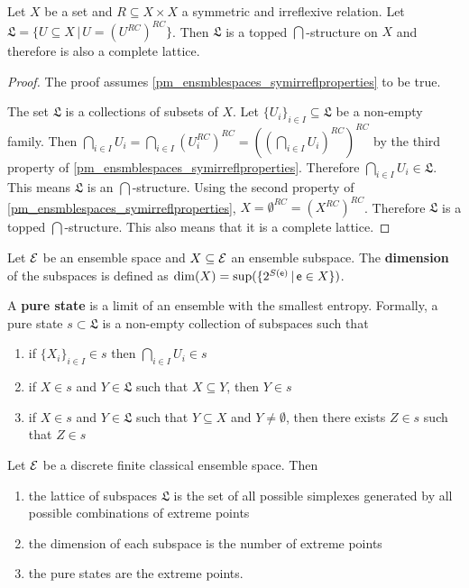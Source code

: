 \begin{conj}
	Let $X$ be a set and $R \subseteq X \times X$ a symmetric and irreflexive relation. Let $\mathfrak{L} = \{ U \subseteq X \, | \, U = (U^{RC})^{RC} \}$. Then $\mathfrak{L}$ is a topped $\bigcap$-structure on $X$ and therefore is also a complete lattice.
\end{conj}
\begin{proof}
	The proof assumes \ref{pm_ensmblespaces_symirreflproperties} to be true.
	
	The set $\mathfrak{L}$ is a collections of subsets of $X$. Let $\{U_i\}_{i \in I} \subseteq \mathfrak{L}$ be a non-empty family. Then $\bigcap_{i \in I} U_i = \bigcap_{i \in I} (U_i^{RC})^{RC} = ((\bigcap_{i \in I} U_i)^{RC})^{RC}$ by the third property of \ref{pm_ensmblespaces_symirreflproperties}. Therefore $\bigcap_{i \in I} U_i \in \mathfrak{L}$. This means $\mathfrak{L}$ is an $\bigcap$-structure. Using the second property of \ref{pm_ensmblespaces_symirreflproperties}, $X = \emptyset^{RC} = (X^{RC})^{RC}$. Therefore $\mathfrak{L}$ is a topped $\bigcap$-structure. This also means that it is a complete lattice.
\end{proof}

\begin{defn}
	Let $\mathcal{E}$ be an ensemble space and $X \subseteq \mathcal{E}$ an ensemble subspace. The \textbf{dimension} of the subspaces is defined as $\dim(X) = \sup(\{2^{S(\mathsf{e})} \, | \, \mathsf{e} \in X\})$.
\end{defn}

\begin{defn}
	A \textbf{pure state} is a limit of an ensemble with the smallest entropy. Formally, a pure state $s \subset \mathfrak{L}$ is a non-empty collection of subspaces such that
	\begin{enumerate}
		\item if $\{X_i\}_{i \in I} \in s$ then $\bigcap_{i \in I} U_i \in s$
		\item if $X \in s$ and $Y \in \mathfrak{L}$ such that $X \subseteq Y$, then $Y \in s$
		\item if $X \in s$ and $Y \in \mathfrak{L}$ such that $Y \subseteq X$ and $Y \neq \emptyset$, then there exists $Z \in s$ such that $Z \in s$
	\end{enumerate}
\end{defn}

\begin{conj}
	Let $\mathcal{E}$ be a discrete finite classical ensemble space. Then
	\begin{enumerate}
		\item the lattice of subspaces $\mathfrak{L}$ is the set of all possible simplexes generated by all possible combinations of extreme points
		\item the dimension of each subspace is the number of extreme points
		\item the pure states are the extreme points.
	\end{enumerate}
\end{conj}

